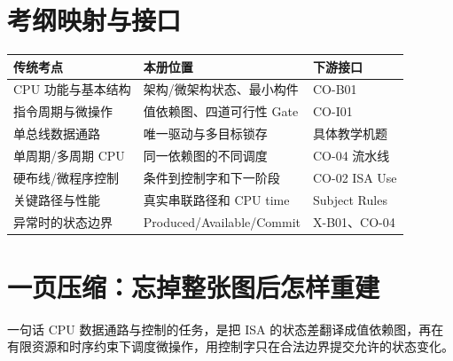 \documentclass[UTF8,fontset=fandol,11pt,a4paper]{ctexart}
\begin{document}
\section{考纲映射与接口}

\begin{center}
\small
\begin{tabularx}{\linewidth}{L{4.0cm}YY}
\toprule
传统考点 & 本册位置 & 下游接口 \\
\midrule
CPU 功能与基本结构 & 架构/微架构状态、最小构件 & CO-B01 \\
指令周期与微操作 & 值依赖图、四道可行性 Gate & CO-I01 \\
单总线数据通路 & 唯一驱动与多目标锁存 & 具体教学机题 \\
单周期/多周期 CPU & 同一依赖图的不同调度 & CO-04 流水线 \\
硬布线/微程序控制 & 条件到控制字和下一阶段 & CO-02 ISA Use \\
关键路径与性能 & 真实串联路径和 CPU time & Subject Rules \\
异常时的状态边界 & Produced/Available/Commit & X-B01、CO-04 \\
\bottomrule
\end{tabularx}
\end{center}

\section{一页压缩：忘掉整张图后怎样重建}

\begin{corebox}{一句话}
CPU 数据通路与控制的任务，是把 ISA 的状态差翻译成值依赖图，再在有限资源和时序约束下调度微操作，用控制字只在合法边界提交允许的状态变化。
\end{corebox}

\begin{center}
\end{center}
\end{document}
